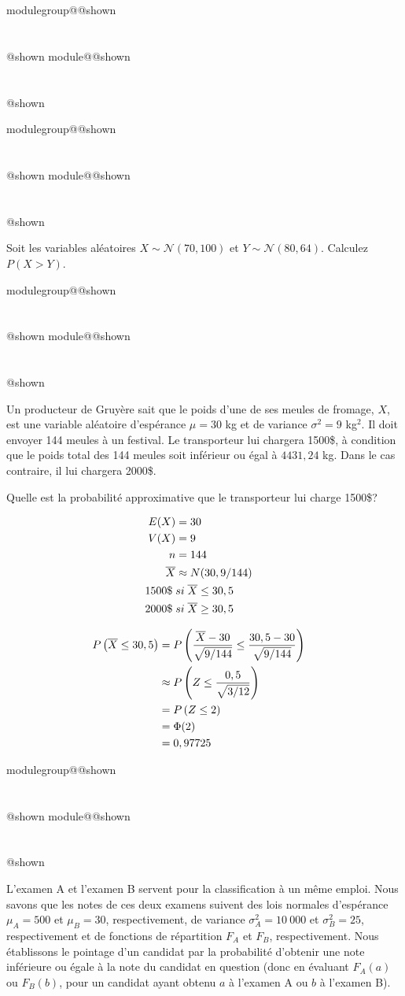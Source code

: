 \documentclass{Evaluation}
\makeatletter
\newcommand{\currentmodulekey}{}
\newcommand{\currentmoduletitle}{}
\newcommand{\currentgroupkey}{}
\newcommand{\currentgrouptitle}{}
\newcommand{\showmoduleifneeded}{%
  \ifx\currentgroupkey\empty\else
    \expandafter\ifx\csname modulegroup@\currentgroupkey @shown\endcsname\relax
      \section*{\currentgrouptitle}%
      \expandafter\gdef\csname modulegroup@\currentgroupkey @shown\endcsname{1}%
    \fi
  \fi
  \expandafter\ifx\csname module@\currentmodulekey @shown\endcsname\relax
    \section*{\currentmoduletitle}%
    \expandafter\gdef\csname module@\currentmodulekey @shown\endcsname{1}%
  \fi
}
\newenvironment{A22}{\showmoduleifneeded}{}
\newenvironment{H25}{\showmoduleifneeded}{}
\newenvironment{H26r}{\showmoduleifneeded}{}
\makeatother
\begin{document}
\begin{questions}
\begin{A22}
\end{A22}

\begin{H25}
\question {} %
Soit les variables aléatoires $X\sim\mathcal{N}(70, 100)$ et $Y\sim\mathcal{N}(80, 64)$.
Calculez $P(X>Y)$.


\end{H25}

\begin{H25}
\question {} %
Un producteur de Gruyère sait que le poids d'une de ses meules de fromage, $X$, est une variable aléatoire d'espérance $\mu=30$ kg et de variance $\sigma^2 = 9$ kg$^2$.
Il doit envoyer 144 meules à un festival.
Le transporteur lui chargera 1500\$, à condition que le poids total des 144 meules soit inférieur ou égal à $4431,24$ kg.
Dans le cas contraire, il lui chargera 2000\$.

Quelle est la probabilité approximative que le transporteur lui charge 1500\$?

\begin{solution}
    \begin{align*}
        E(X) &= 30 \cr
        V(X) &= 9 \cr
        n&= 144 \cr
        \overline{X} &\approx N(30, 9/144) \cr
        1500 \$ \; &si \; \overline{X} \leq 30,5 \cr
        2000 \$ \; &si \; \overline{X} \geq 30,5
    \end{align*}

    \begin{align*}
        P\left( \overline{X} \leq 30,5 \right)
        &= P\left( \frac{\overline{X}-30}{\sqrt{9/144}} \leq \frac{30,5-30}{\sqrt{9/144}}  \right) \cr
        &\approx P\left( Z \leq \frac{0,5}{\sqrt{3/12}}  \right) \cr
        &= P\left( Z \leq 2 \right) \cr
        &= \Phi(2) \cr
        &= 0,97725
    \end{align*}
\end{solution}
\end{H25}

\begin{H26r}
\question {} %
L'examen A et l'examen B servent pour la classification à un même emploi.
Nous savons que les notes de ces deux examens suivent des lois normales d'espérance $\mu_{A}=500$ et $\mu_{B}=30$, respectivement, de variance $\sigma^2_{A}=10\ 000$ et $\sigma^2_{B}=25$, respectivement et de fonctions de répartition $F_A$ et $F_B$, respectivement.
Nous établissons le pointage d'un candidat par la probabilité d'obtenir une note inférieure ou égale à la note du candidat en question (donc en évaluant $F_A(a)$ ou $F_B(b)$, pour un candidat ayant obtenu $a$ à l'examen A ou $b$ à l'examen B).


\end{H26r}
\end{questions}
\end{document}
